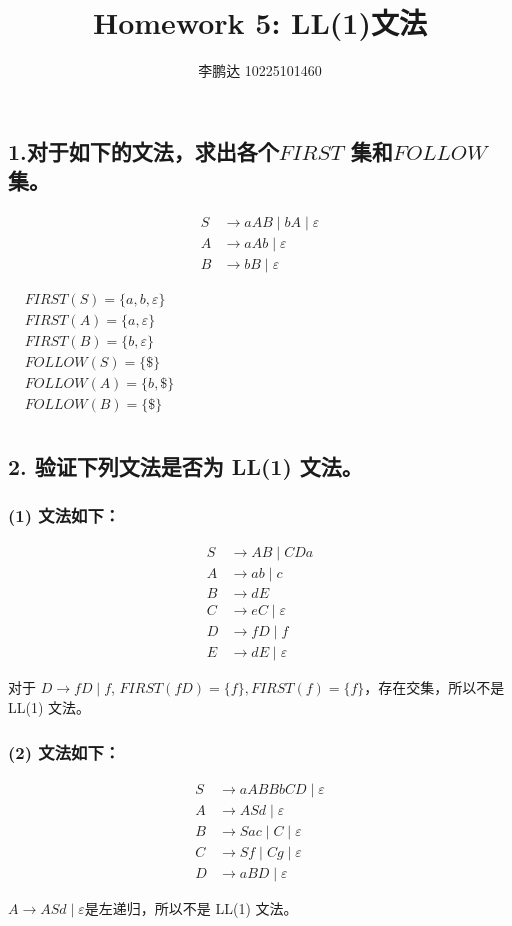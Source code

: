 \documentclass[a4paper, body={18cm,22cm}]{article}
\title{Homework 5: LL(1)文法}
\author{李鹏达 10225101460}
\date{}
\begin{document}
\maketitle

\subsection*{1.对于如下的文法，求出各个$FIRST$ 集和$FOLLOW$集。}

\[
\begin{aligned}
S &\rightarrow aAB \mid bA \mid \varepsilon \\
A &\rightarrow aAb \mid \varepsilon \\
B &\rightarrow bB \mid \varepsilon
\end{aligned}
\]

$
\begin{aligned}
    &FIRST(S) = \{a, b, \varepsilon\} \\
    &FIRST(A) = \{a, \varepsilon\} \\
    &FIRST(B) = \{b, \varepsilon\} \\
    &FOLLOW(S) = \{\$\} \\
    &FOLLOW(A) = \{b, \$\} \\
    &FOLLOW(B) = \{\$\} \\
\end{aligned}
$

\subsection*{2. 验证下列文法是否为 LL(1) 文法。}

\subsubsection*{(1) 文法如下：}

\[
\begin{aligned}
S &\rightarrow AB \mid CDa \\
A &\rightarrow ab \mid c \\
B &\rightarrow dE \\
C &\rightarrow eC \mid \varepsilon \\
D &\rightarrow fD \mid f \\
E &\rightarrow dE \mid \varepsilon
\end{aligned}
\]

对于 $D \to fD \mid f$, $FIRST(fD) = \{f\}, FIRST(f) = \{f\}$，存在交集，所以不是 LL(1) 文法。

\subsubsection*{(2) 文法如下：}

\[
\begin{aligned}
S &\rightarrow aABBbCD \mid \varepsilon \\
A &\rightarrow ASd \mid \varepsilon \\
B &\rightarrow Sac \mid C \mid \varepsilon \\
C &\rightarrow Sf \mid Cg \mid \varepsilon \\
D &\rightarrow aBD \mid \varepsilon
\end{aligned}
\]

$A \to ASd \mid \varepsilon$是左递归，所以不是 LL(1) 文法。
\end{document}

